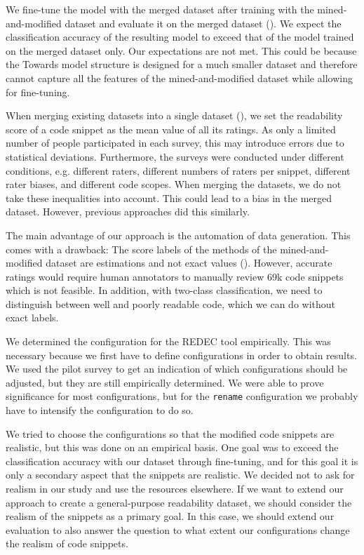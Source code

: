 \documentclass[%
class=scrreprt,
chapterprefix=false,%
open=right,%
twoside=true,%
paper=a4,%
logofile={Logo\_zentral\_farbig\_EN.png},%
thesistype=master,%
UKenglish,%
]{se2thesis}
\theoremstyle{definition}
\newcommand{\citeolddataset}{\cite{buse2009learning, dorn2012general, scalabrino2018comprehensive}\xspace}
\newcommand{\numSamples}{69k\xspace}
\begin{document}
	We fine-tune the model with the merged dataset after training with the mined-and-modified dataset and evaluate it on the merged dataset (). We expect the classification accuracy of the resulting model to exceed that of the model trained on the merged dataset only.
	Our expectations are not met. This could be because the Towards model structure is designed for a much smaller dataset and therefore cannot capture all the features of the mined-and-modified dataset while allowing for fine-tuning.

	When merging existing datasets \citeolddataset into a single dataset (), we set the readability score of a code snippet as the mean value of all its ratings. As only a limited number of people participated in each survey, this may introduce errors due to statistical deviations.
	Furthermore, the surveys were conducted under different conditions, e.g. different raters, different numbers of raters per snippet, different rater biases, and different code scopes. When merging the datasets, we do not take these inequalities into account. This could lead to a bias in the merged dataset. However, previous approaches did this similarly.
	
	The main advantage of our approach is the automation of data generation.
	This comes with a drawback: The score labels of the methods of the mined-and-modified dataset are estimations and not exact values (). However, accurate ratings would require human annotators to manually review \numSamples code snippets which is not feasible. In addition, with two-class classification, we need to distinguish between well and poorly readable code, which we can do without exact labels.
	
	We determined the configuration for the REDEC tool empirically. This was necessary because we first have to define configurations in order to obtain results. We used the pilot survey to get an indication of which configurations should be adjusted, but they are still empirically determined. We were able to prove significance for most configurations, but for the \texttt{rename} configuration we probably have to intensify the configuration to do so.
	
	We tried to choose the configurations so that the modified code snippets are realistic, but this was done on an empirical basis. One goal was to exceed the classification accuracy with our dataset through fine-tuning, and for this goal it is only a secondary aspect that the snippets are realistic. We decided not to ask for realism in our study and use the resources elsewhere. If we want to extend our approach to create a general-purpose readability dataset, we should consider the realism of the snippets as a primary goal. In this case, we should extend our evaluation to also answer the question to what extent our configurations change the realism of code snippets.
	
\end{document}
